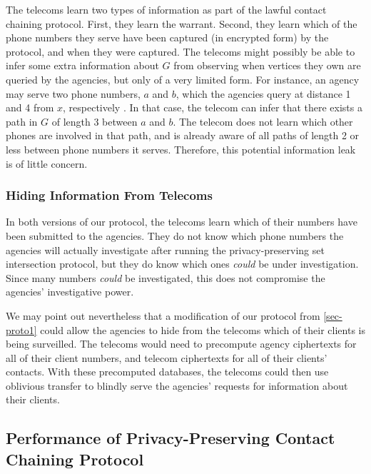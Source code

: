 The telecoms learn two types of information as part of the lawful contact chaining protocol. First, they learn the warrant. Second, they learn which of the phone numbers they serve have been captured (in encrypted form) by the protocol, and when they were captured. The telecoms might possibly be able to infer some extra information about $G$ from observing when vertices they own are queried by the agencies, but only of a very limited form. For instance, an agency may serve two phone numbers, $a$ and $b$, which the agencies query at distance 1 and 4 from $x$, respectively . In that case, the telecom can infer that there exists a path in $G$ of length 3 between $a$ and $b$. The telecom does not learn which other phones are involved in that path, and is already aware of all paths of length 2 or less between phone numbers it serves. Therefore, this potential information leak is of little concern.



\subsubsection{Hiding Information From Telecoms}

\label{sec:oblivious}



In both versions of our protocol, the telecoms learn which of their numbers have been submitted to the agencies. They do not know which phone numbers the agencies will actually investigate after running the privacy-preserving set intersection protocol, but they do know which ones \emph{could} be under investigation. Since many numbers \emph{could} be investigated, this does not compromise the agencies' investigative power.



We may point out nevertheless that a modification of our protocol from \ref{sec-proto1} could allow the agencies to hide from the telecoms which of their clients is being surveilled. The telecoms would need to precompute agency ciphertexts for all of their client numbers, and telecom ciphertexts for all of their clients' contacts. With these precomputed databases, the telecoms could then use oblivious transfer to blindly serve the agencies' requests for information about their clients.



\subsection{Performance of Privacy-Preserving Contact Chaining Protocol}

